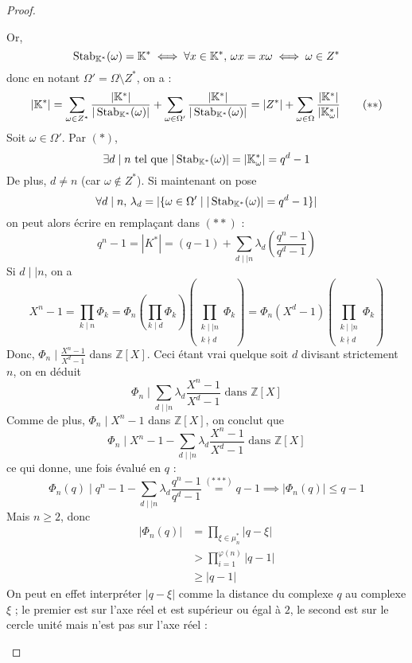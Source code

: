 \begin{proof}
\begin{itemize}
      Or,
      \[ \operatorname{Stab}_{\mathbb{K}^*}(\omega) = \mathbb{K}^* \iff \forall x \in \mathbb{K}^*, \, \omega x = x \omega \iff \omega \in Z^* \]
      donc en notant $\Omega' = \Omega \setminus Z^*$, on a :
      \[ |\mathbb{K}^*| = \sum_{\omega \in Z^*} \frac{|\mathbb{K}^*|}{|\operatorname{Stab}_{\mathbb{K}^*}(\omega)|} + \sum_{\omega \in \Omega'} \frac{|\mathbb{K}^*|}{|\operatorname{Stab}_{\mathbb{K}^*}(\omega)|} = |Z^*| + \sum_{\omega \in \Omega} \frac{|\mathbb{K}^*|}{|\mathbb{K}^*_\omega|} \tag{$**$} \]
      Soit $\omega \in \Omega'$. Par $(*)$,
      \[ \exists d \mid n \text{ tel que } |\operatorname{Stab}_{\mathbb{K}^*}(\omega)| = |\mathbb{K}^*_\omega| = q^d - 1 \]
      De plus, $d \neq n$ (car $\omega \notin Z^*$). Si maintenant on pose
      \[ \forall d \mid n, \, \lambda_d = |\{ \omega \in \Omega' \mid |\operatorname{Stab}_{\mathbb{K}^*}(\omega)| = q^d - 1 \}| \]
      on peut alors écrire en remplaçant dans $(**)$ :
      \[ q^n - 1 = |K^*| = (q - 1) + \sum_{d \mid \mid n} \lambda_d \left( \frac{q^n - 1}{q^d - 1} \right) \tag{$***$} \]
      Si $d \mid \mid n$, on a
      \[ X^n-1 = \prod_{k \mid n} \Phi_k = \Phi_n \left ( \prod_{k \mid d} \Phi_k \right ) \left ( \prod_{\substack{k \mid \mid n \\ k \nmid d}} \Phi_k \right ) = \Phi_n (X^d - 1) \left ( \prod_{\substack{k \mid \mid n \\ k \nmid d}} \Phi_k \right ) \]
      Donc, $\Phi_n \mid \frac{X^n - 1}{X^d - 1}$ dans $\mathbb{Z}[X]$. Ceci étant vrai quelque soit $d$ divisant strictement $n$, on en déduit
      \[ \Phi_n \mid \sum_{d \mid \mid n} \lambda_d \frac{X^n - 1}{X^d - 1} \text{ dans } \mathbb{Z}[X] \]
      Comme de plus, $\Phi_n \mid X^n - 1$ dans $\mathbb{Z}[X]$, on conclut que
      \[ \Phi_n \mid X^n - 1 - \sum_{d \mid \mid n} \lambda_d \frac{X^n - 1}{X^d - 1} \text{ dans } \mathbb{Z}[X] \]
      ce qui donne, une fois évalué en $q$ :
      \[ \Phi_n(q) \mid q^n - 1 - \sum_{d \mid \mid n} \lambda_d \frac{q^n - 1}{q^d - 1} \overset{(***)}{=} q-1 \implies |\Phi_n(q)| \leq q-1 \]
      Mais $n \geq 2$, donc
      \begin{align*}
        |\Phi_n(q)| &= \prod_{\xi \in \mu_n^*} |q - \xi| \\
        &> \prod_{i=1}^{\varphi(n)} |q - 1| \\
        &\geq |q-1|
      \end{align*}
      On peut en effet interpréter $|q - \xi|$ comme la distance du complexe $q$ au complexe $\xi$ ; le premier est sur l'axe réel et est supérieur ou égal à $2$, le second est sur le cercle unité mais n'est pas sur l'axe réel :
      \begin{center}

\end{center}
\end{itemize}
\end{proof}
